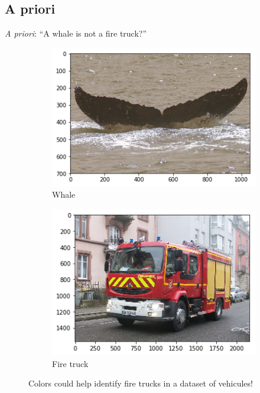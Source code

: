 \subsection{A priori}
\begin{frame}[c]{\emph{A priori}: ``A whale is not a fire truck?''}
    \begin{figure}
        \centering
        \begin{subfigure}[b]{0.4\linewidth}
            \centering
            \includegraphics[width=\linewidth]{normal.png}
            \caption{Whale}
        \end{subfigure}
        \begin{subfigure}[b]{0.4\linewidth}
            \centering
            \includegraphics[width=\linewidth]{firetruck.png}
            \caption{Fire truck}
        \end{subfigure}
        \caption{Colors could help identify fire trucks in a dataset of vehicules!}
    \end{figure}
\end{frame}

